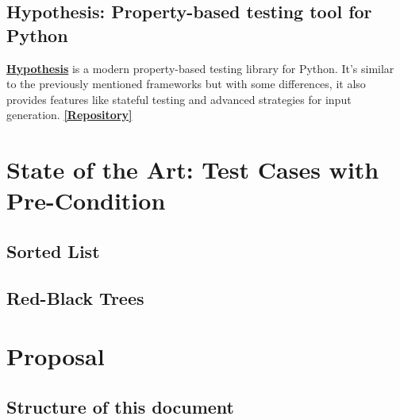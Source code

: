 \documentclass{report}
\newcommand{\bhref}[2]{\textbf{\href{#1}{#2}}}
\newcommand{\repo}[1]{\bhref{#1}{[Repository]}}
\begin{document}
\subsection{Hypothesis: Property-based testing tool for Python}

\bhref{https://hypothesis.readthedocs.io/en/latest/}{Hypothesis} is a modern property-based testing library for Python. It's similar to the previously mentioned frameworks but with some differences, it also provides features like stateful testing and advanced strategies for input generation. \repo{https://github.com/HypothesisWorks/hypothesis}

\section{State of the Art: Test Cases with Pre-Condition}



\subsection{Sorted List}

\subsection{Red-Black Trees}

\section{Proposal}

\subsection*{Structure of this document}
\end{document}

